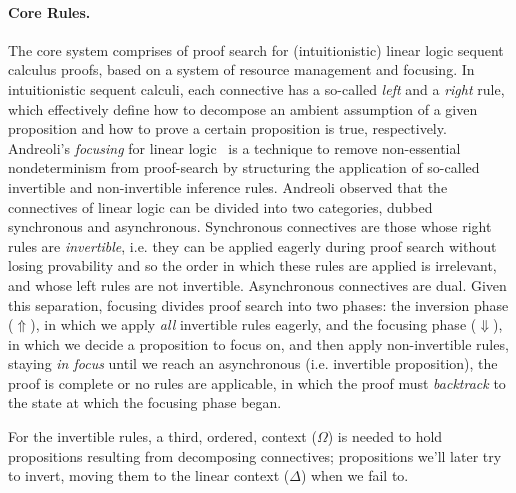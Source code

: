 \documentclass{llncs}
\newcommand{\mypara}[1]{\paragraph{\textbf{#1}.}}
\begin{document}
\mypara{Core Rules} The core system comprises of proof search for
(intuitionistic) linear logic sequent calculus proofs, based on a
system of resource management and focusing.
%
In intuitionistic sequent calculi, each connective has a so-called
\emph{left} and a \emph{right} rule, which effectively define how to
decompose an ambient assumption of a given proposition and how to
prove a certain proposition is true, respectively. 
Andreoli's \emph{focusing} for linear logic~\cite{Andreolli focusing}
is a technique to remove non-essential nondeterminism from
proof-search by structuring the application of so-called invertible
and non-invertible inference rules. Andreoli observed that the
connectives of linear logic can be divided into two categories, dubbed
synchronous and asynchronous. Synchronous connectives are those whose
right rules are \emph{invertible}, i.e. they can be applied eagerly
during proof search without losing provability and so the order in
which these rules are applied is irrelevant, and whose left rules
are not invertible. Asynchronous connectives are dual. 
%
Given this separation, focusing divides proof search into two
phases: %
the inversion phase ($\Uparrow$), in which we apply \emph{all} invertible rules
eagerly, and the focusing phase  ($\Downarrow$), in which we decide a proposition
to focus on, and then apply non-invertible rules, staying \emph{in focus}
until we reach an asynchronous (i.e. invertible proposition), the
proof is complete or no rules are applicable, in which the proof must
\emph{backtrack} to the state at which the focusing phase began.

For the invertible rules, a
third, ordered, context ($\Omega$) is needed to hold propositions
resulting from decomposing connectives; propositions we'll later try
to invert, moving them to the linear context ($\Delta$) when we fail
to.

%
\end{document}

